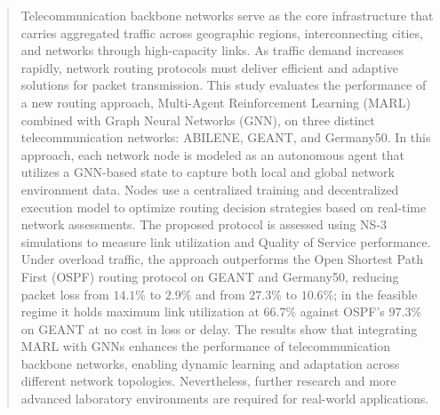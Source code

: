 
\begin{abstract}
Telecommunication backbone networks serve as the core infrastructure that carries aggregated traffic across geographic regions, interconnecting cities, and networks through high-capacity links. As traffic demand increases rapidly, network routing protocols must deliver efficient and adaptive solutions for packet transmission. This study evaluates the performance of a new routing approach, Multi-Agent Reinforcement Learning (MARL) combined with Graph Neural Networks (GNN), on three distinct telecommunication networks: ABILENE, GEANT, and Germany50. In this approach, each network node is modeled as an autonomous agent that utilizes a GNN-based state to capture both local and global network environment data. Nodes use a centralized training and decentralized execution model to optimize routing decision strategies based on real-time network assessments. The proposed protocol is assessed using NS-3 simulations to measure link utilization and Quality of Service performance. Under overload traffic, the approach outperforms the Open Shortest Path First (OSPF) routing protocol on GEANT and Germany50, reducing packet loss from $14.1\%$ to $2.9\%$ and from $27.3\%$ to $10.6\%$; in the feasible regime it holds maximum link utilization at $66.7\%$ against OSPF's $97.3\%$ on GEANT at no cost in loss or delay. The results show that integrating MARL with GNNs enhances the performance of telecommunication backbone networks, enabling dynamic learning and adaptation across different network topologies. Nevertheless, further research and more advanced laboratory environments are required for real-world applications.\end{abstract}